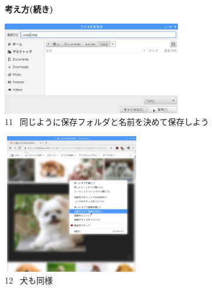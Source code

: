 \documentclass[a4paper,12pt]{jarticle}
\begin{document}
\begin{figure}[t]
  \textbf{考え方(続き)}



  \centering
  \begin{minipage}{\textwidth}
    \begin{minipage}{7.882cm}
      \includegraphics[width=7.811cm,height=4.053cm]{textbook-img103.png}\\
      11 \ 同じように保存フォルダと名前を決めて保存しよう
    \end{minipage}
    \begin{minipage}{2.582cm}
    \end{minipage}
    \begin{minipage}{6.257cm}
      \includegraphics[width=6.041cm,height=6.094cm]{textbook-img092.png}\\
      12 \ 犬も同様
    \end{minipage}
  \end{minipage}


  \bigskip



\end{figure}
\end{document}
